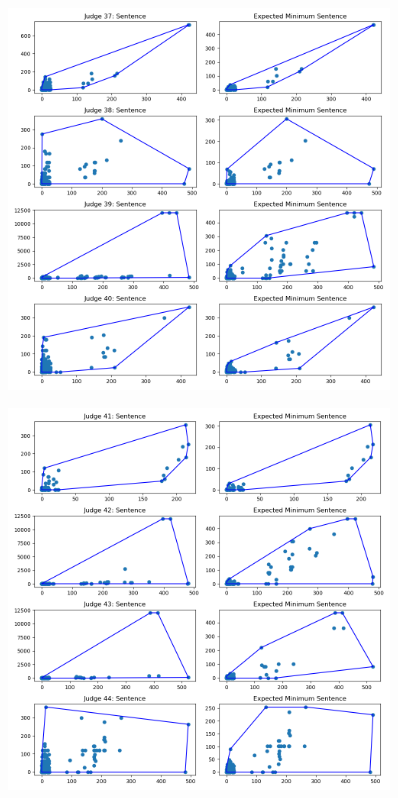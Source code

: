 \documentclass[11pt, oneside]{article}   	%
\theoremstyle{ModifiedStyle}
\begin{document}
			\begin{figure}[H]
				\centering
				\includegraphics[width=0.9\textwidth]{../../output/figures/Exploration/judge_convex_hulls_9.png}
			\end{figure}

			\begin{figure}[H]
				\centering
				\includegraphics[width=0.9\textwidth]{../../output/figures/Exploration/judge_convex_hulls_10.png}
			\end{figure}
\end{document}
